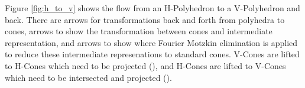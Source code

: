 Figure \ref{fig:h_to_v} shows the flow from an H-Polyhedron to a V-Polyhedron and back.  There are \textcolor{\ptovcolor}{arrows} for transformations back and forth from polyhedra to cones, \textcolor{\liftcolor}{arrows} to show the transformation between cones and intermediate representation, and \textcolor{\dropcolor}{arrows} to show where Fourier Motzkin elimination is applied to reduce these intermediate represenations to standard cones.  V-Cones are \textcolor{\liftcolor}{lifted} to H-Cones which need to be \textcolor{\dropcolor}{projected (\HDropdesc)}, and H-Cones are \textcolor{\liftcolor}{lifted} to V-Cones which need to be \textcolor{\dropcolor}{intersected and projected (\VDropdesc)}.
